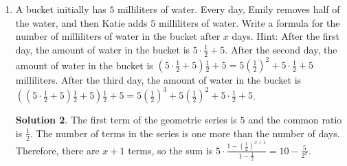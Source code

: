 \documentclass{article}
\theoremstyle{definition}
\newtheorem*{solution}{Solution}
\begin{document}
\begin{enumerate}
\begin{solution}
            six movies is $Y + (Y + 3) + (Y + 6) + (Y + 9) + (Y + 12) + (Y + 15)
            = 6Y + 45$. We are told this sum equals $12057$, so we can solve
            $6Y + 45 = 12057$ for $Y$. Doing so, we get $6Y = 12012$ and $Y =
            2002$. If the movie came out in $2002$, then the seventh movie is
            expected to come out in $2002 + 3 \cdot 6 = 2002 + 18 = 2020$.
        \end{solution}
        \item A bucket initially has $5$ milliliters of water. Every day, Emily
        removes half of the water, and then Katie adds $5$ milliliters of water.
        Write a formula for the number of milliliters of water in the bucket
        after $x$ days. Hint: After the first day, the amount of water in the
        bucket is $5 \cdot \frac{1}{2} + 5$. After the second day, the amount of
        water in the bucket is $\left(5 \cdot \frac{1}{2} + 5\right)\frac{1}{2}
        + 5 = 5\left(\frac{1}{2}\right)^2 + 5 \cdot \frac{1}{2} + 5$
        milliliters. After the third day, the amount of water in the bucket is
        $\left(\left(5 \cdot \frac{1}{2} + 5\right)\frac{1}{2} +
        5\right)\frac{1}{2} + 5 = 5\left(\frac{1}{2}\right)^3 +
        5\left(\frac{1}{2}\right)^2 + 5 \cdot \frac{1}{2} + 5$.
        \begin{solution}
            The first term of the geometric series is $5$ and the common ratio
            is $\frac{1}{2}$. The number of terms in the series is one more than
            the number of days. Therefore, there are $x + 1$ terms, so the sum
            is $5 \cdot \frac{1 - \left(\frac{1}{2}\right)^{x + 1}}{1 -
            \frac{1}{2}} = 10 - \frac{5}{2^x}$.
        \end{solution}
    \end{enumerate}
\end{document}
